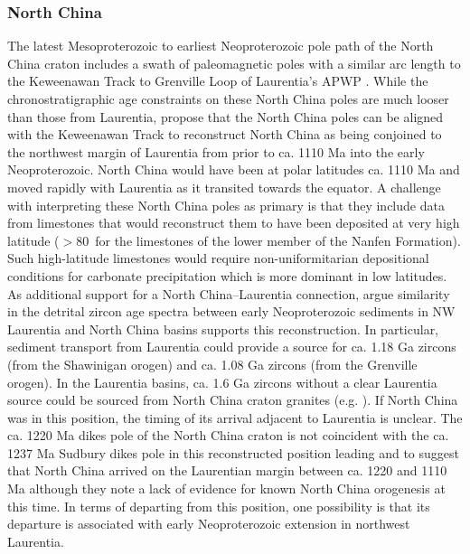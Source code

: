 \documentclass[twocolumn, switch]{article} %
\begin{document}

\subsubsection{North China}

The latest Mesoproterozoic to earliest Neoproterozoic pole path of the North China craton includes a swath of paleomagnetic poles with a similar arc length to the Keweenawan Track to Grenville Loop of Laurentia's APWP \citep{Zhao2019a, Zhang2021a}. While the chronostratigraphic age constraints on these North China poles are much looser than those from Laurentia, \cite{Zhao2019a} propose that the North China poles can be aligned with the Keweenawan Track to reconstruct North China as being conjoined to the northwest margin of Laurentia from prior to ca. 1110 Ma into the early Neoproterozoic. North China would have been at polar latitudes ca. 1110 Ma and moved rapidly with Laurentia as it transited towards the equator. A challenge with interpreting these North China poles as primary is that they include data from limestones that would reconstruct them to have been deposited at very high latitude ($>$80\textdegree\ for the limestones of the lower member of the Nanfen Formation). Such high-latitude limestones would require non-uniformitarian depositional conditions for carbonate precipitation which is more dominant in low latitudes. As additional support for a North China--Laurentia connection, \cite{Zhao2019a} argue similarity in the detrital zircon age spectra between early Neoproterozoic sediments in NW Laurentia and North China basins supports this reconstruction. In particular, sediment transport from Laurentia could provide a source for ca. 1.18 Ga zircons (from the Shawinigan orogen) and ca. 1.08 Ga zircons (from the Grenville orogen). In the Laurentia basins, ca. 1.6 Ga zircons without a clear Laurentia source could be sourced from North China craton granites (e.g. \citealp{Wang2020a}). If North China was in this position, the timing of its arrival adjacent to Laurentia is unclear. The ca. 1220 Ma dikes pole of the North China craton is not coincident with the ca. 1237 Ma Sudbury dikes pole in this reconstructed position leading \cite{Zhao2019a} and \cite{Zhang2021a} to suggest that North China arrived on the Laurentian margin between ca. 1220 and 1110 Ma although they note a lack of evidence for known North China orogenesis at this time. In terms of departing from this position, one possibility is that its departure is associated with early Neoproterozoic extension in northwest Laurentia.
\end{document}
